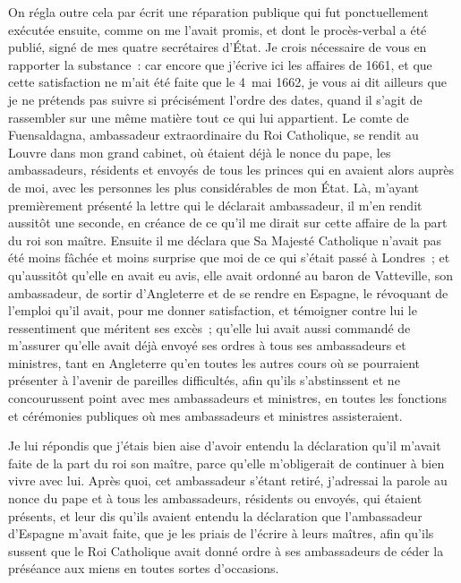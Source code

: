 \documentclass[french,twoside]{book} %
\begin{document}
On régla outre cela par écrit une réparation publique qui fut ponctuellement exécutée ensuite, comme on me l’avait promis, et dont le procès-verbal a été publié, signé de mes quatre secrétaires d’État. Je crois nécessaire de vous en rapporter la substance : car encore que j’écrive ici les affaires de 1661, et que cette satisfaction ne m’ait été faite que le 4 mai 1662, je vous ai dit ailleurs que je ne prétends pas suivre si précisément l’ordre des dates, quand il s’agit de rassembler sur une même matière tout ce qui lui appartient. Le comte de Fuensaldagna, ambassadeur extraordinaire du Roi Catholique, se rendit au Louvre dans mon grand cabinet, où étaient déjà le nonce du pape, les ambassadeurs, résidents et envoyés de tous les princes qui en avaient alors auprès de moi, avec les personnes les plus considérables de mon État. Là, m’ayant premièrement présenté la lettre qui le déclarait ambassadeur, il m’en rendit aussitôt une seconde, en créance de ce qu’il me dirait sur cette affaire de la part du roi son maître. Ensuite il me déclara que Sa Majesté Catholique n’avait pas été moins fâchée et moins surprise que moi de ce qui s’était passé à Londres ; et qu’aussitôt qu’elle en avait eu avis, elle avait ordonné au baron de Vatteville, son ambassadeur, de sortir d’Angleterre et de se rendre en Espagne, le révoquant de l’emploi qu’il avait, pour me donner satisfaction, et témoigner contre lui le ressentiment que méritent ses excès ; qu’elle lui avait aussi commandé de m’assurer qu’elle avait déjà envoyé ses ordres à tous ses ambassadeurs et ministres, tant en Angleterre qu’en toutes les autres cours où se pourraient présenter à l’avenir de pareilles difficultés, afin qu’ils s’abstinssent et ne concourussent point avec mes ambassadeurs et ministres, en toutes les fonctions et cérémonies publiques où mes ambassadeurs et ministres assisteraient.\par
Je lui répondis que j’étais bien aise d’avoir entendu la déclaration qu’il m’avait faite de la part du roi son maître, parce qu’elle m’obligerait de continuer à bien vivre avec lui. Après quoi, cet ambassadeur s’étant retiré, j’adressai la parole au nonce du pape et à tous les ambassadeurs, résidents ou envoyés, qui étaient présents, et leur dis qu’ils avaient entendu la déclaration que l’ambassadeur d’Espagne m’avait faite, que je les priais de l’écrire à leurs maîtres, afin qu’ils sussent que le Roi Catholique avait donné ordre à ses ambassadeurs de céder la préséance aux miens en toutes sortes d’occasions.\par
\end{document}
